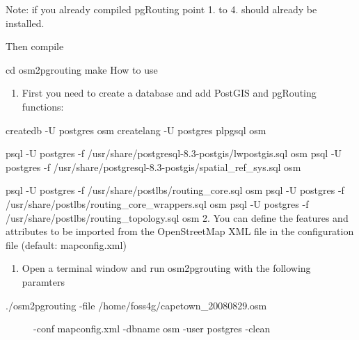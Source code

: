 \documentclass[a4paper,10pt,english]{manual}
\begin{document}
Note: if you already compiled pgRouting point 1. to 4. should already be installed.

Then compile

cd osm2pgrouting
make
How to use
\begin{enumerate}
\item {} 
First you need to create a database and add PostGIS and pgRouting functions:

\end{enumerate}

createdb -U postgres osm
createlang -U postgres plpgsql osm

psql -U postgres -f /usr/share/postgresql-8.3-postgis/lwpostgis.sql osm
psql -U postgres -f /usr/share/postgresql-8.3-postgis/spatial\_ref\_sys.sql osm

psql -U postgres -f /usr/share/postlbs/routing\_core.sql osm
psql -U postgres -f /usr/share/postlbs/routing\_core\_wrappers.sql osm
psql -U postgres -f /usr/share/postlbs/routing\_topology.sql osm
2. You can define the features and attributes to be imported from the OpenStreetMap XML file in the configuration file (default: mapconfig.xml)
\begin{enumerate}
\item {} 
Open a terminal window and run osm2pgrouting with the following paramters

\end{enumerate}
\begin{description}
\item[./osm2pgrouting -file /home/foss4g/capetown\_20080829.osm ] \leavevmode
-conf mapconfig.xml -dbname osm -user postgres -clean

\end{description}
\end{document}
